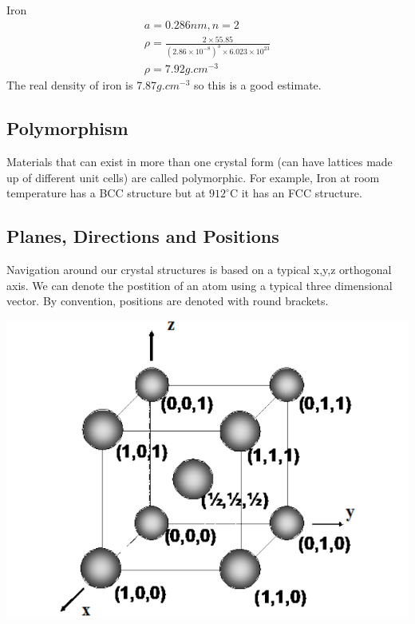 \documentclass[12pt]{article}
\begin{document}
\begin{example}
  Iron
  \begin{gather*}
    a = 0.286\unit{nm }, n = 2 \\
    \rho = \frac{ 2 \times 55.85 }{(2.86\times10^{-8})^3 \times 6.023 \times 10^{23}} \\
    \rho = 7.92\unit{g.cm}^{-3}
  \end{gather*}
  The real density of iron is 7.87$\unit{g.cm}^{-3}$ so this is a good estimate.
\end{example}

\subsection{Polymorphism}
Materials that can exist in more than one crystal form (can have lattices made up of different unit cells) are called polymorphic. 
For example, Iron at room temperature has a BCC structure but at $912^\circ$C it has an FCC structure.

\newpage
\subsection{Planes, Directions and Positions}
Navigation around our crystal structures is based on a typical x,y,z orthogonal axis. 
We can denote the postition of an atom using a typical three dimensional vector. 
By convention, positions are denoted with round brackets.

\begin{marginfigure}
  \vspace{-1.5cm}
  \includegraphics[scale=0.2]{positions}
\end{marginfigure}
\end{document}
